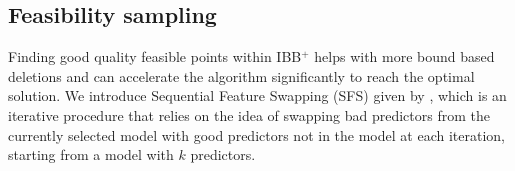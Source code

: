 \documentclass[10pt, letterpaper]{article}
\begin{document}
\subsection{Feasibility sampling}
Finding good quality feasible points within IBB$^{+}$ helps with more bound based deletions and can accelerate the algorithm significantly to reach the optimal solution. We introduce Sequential Feature Swapping (SFS) given by \algorithmcfname{ \ref{alg:sfs}}, which is an iterative procedure that relies on the idea of swapping bad predictors from the currently selected model with good predictors not in the model at each iteration, starting from a model with $k$ predictors.  
\end{document}
